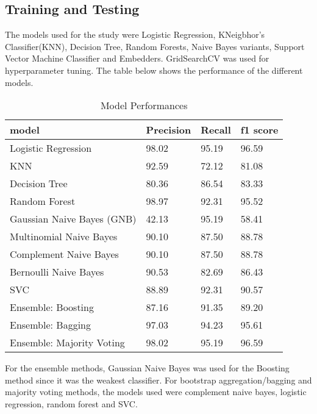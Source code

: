 \subsection{Training and Testing}
The models used for the study were Logistic Regression, KNeigbhor's Classifier(KNN), Decision Tree, Random Forests, Naive Bayes variants, Support Vector Machine Classifier and Embedders. GridSearchCV was used for hyperparameter tuning.
The table below shows the performance of the different models. 

\begin{table}[H]
    \centering
    \begin{tabular}{|l|l|l|l|}
    \hline
model                      & Precision & Recall & f1 score  \\
\hline
Logistic Regression        & 98.02     & 95.19  & 96.59     \\
\hline
KNN                        & 92.59     & 72.12  & 81.08     \\
\hline
Decision Tree              & 80.36     & 86.54  & 83.33     \\
\hline
Random Forest              & 98.97     & 92.31  & 95.52     \\
\hline
Gaussian Naive Bayes (GNB) & 42.13     & 95.19  & 58.41     \\
\hline
Multinomial Naive Bayes    & 90.10     & 87.50  & 88.78     \\
\hline
Complement Naive Bayes     & 90.10     & 87.50  & 88.78     \\
\hline
Bernoulli Naive Bayes      & 90.53     & 82.69  & 86.43     \\
\hline
SVC                        & 88.89     & 92.31  & 90.57     \\
\hline
Ensemble: Boosting         & 87.16     & 91.35  & 89.20     \\
\hline
Ensemble: Bagging          & 97.03     & 94.23  & 95.61     \\
\hline
Ensemble: Majority Voting  & 98.02     & 95.19  & 96.59   \\ 
\hline
\end{tabular}
    \caption{Model Performances}
    \label{tab:mp}
\end{table}

For the ensemble methods, Gaussian Naive Bayes was used for the Boosting method since it was the weakest classifier. For bootstrap aggregation/bagging and majority voting methods, the models used were complement naive bayes, logistic regression, random forest and SVC.